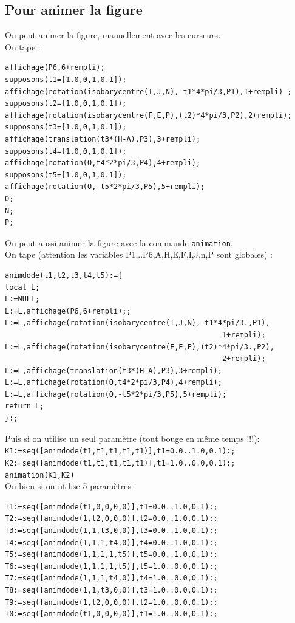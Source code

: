 \documentclass[a4paper,11pt]{book}
\begin{document}
\subsection{Pour animer la figure}
On peut animer la figure, manuellement avec les curseurs.\\
On tape :
\begin{verbatim}
affichage(P6,6+rempli);
supposons(t1=[1.0,0,1,0.1]);
affichage(rotation(isobarycentre(I,J,N),-t1*4*pi/3,P1),1+rempli) ;
supposons(t2=[1.0,0,1,0.1]);
affichage(rotation(isobarycentre(F,E,P),(t2)*4*pi/3,P2),2+rempli);
supposons(t3=[1.0,0,1,0.1]);
affichage(translation(t3*(H-A),P3),3+rempli);
supposons(t4=[1.0,0,1,0.1]);
affichage(rotation(O,t4*2*pi/3,P4),4+rempli);
supposons(t5=[1.0,0,1,0.1]);
affichage(rotation(O,-t5*2*pi/3,P5),5+rempli);
O;
N;
P;
\end{verbatim}
On peut aussi animer la figure avec la commande {\tt animation}.\\
On tape (attention les variables P1,..P6,A,H,E,F,I,J,n,P sont globales) :
\begin{verbatim}
animdode(t1,t2,t3,t4,t5):={
local L; 
L:=NULL;
L:=L,affichage(P6,6+rempli);;
L:=L,affichage(rotation(isobarycentre(I,J,N),-t1*4*pi/3.,P1),
                                                  1+rempli);
L:=L,affichage(rotation(isobarycentre(F,E,P),(t2)*4*pi/3.,P2),
                                                  2+rempli);
L:=L,affichage(translation(t3*(H-A),P3),3+rempli);
L:=L,affichage(rotation(O,t4*2*pi/3,P4),4+rempli);
L:=L,affichage(rotation(O,-t5*2*pi/3,P5),5+rempli);
return L;
}:;
\end{verbatim}
Puis si on utilise un seul param\`etre (tout bouge en m\^eme temps !!!):\\
{\tt K1:=seq([animdode(t1,t1,t1,t1,t1)],t1=0.0..1.0,0.1):;}\\
{\tt K2:=seq([animdode(t1,t1,t1,t1,t1)],t1=1.0..0.0,0.1):;}\\
{\tt animation(K1,K2)}\\
Ou bien si on utilise 5 param\`etres :
\begin{verbatim}
T1:=seq([animdode(t1,0,0,0,0)],t1=0.0..1.0,0.1):;
T2:=seq([animdode(1,t2,0,0,0)],t2=0.0..1.0,0.1):;
T3:=seq([animdode(1,1,t3,0,0)],t3=0.0..1.0,0.1):;
T4:=seq([animdode(1,1,1,t4,0)],t4=0.0..1.0,0.1):;
T5:=seq([animdode(1,1,1,1,t5)],t5=0.0..1.0,0.1):;
T6:=seq([animdode(1,1,1,1,t5)],t5=1.0..0.0,0.1):;
T7:=seq([animdode(1,1,1,t4,0)],t4=1.0..0.0,0.1):;
T8:=seq([animdode(1,1,t3,0,0)],t3=1.0..0.0,0.1):;
T9:=seq([animdode(1,t2,0,0,0)],t2=1.0..0.0,0.1):;
T0:=seq([animdode(t1,0,0,0,0)],t1=1.0..0.0,0.1):;
\end{verbatim}
\end{document}
